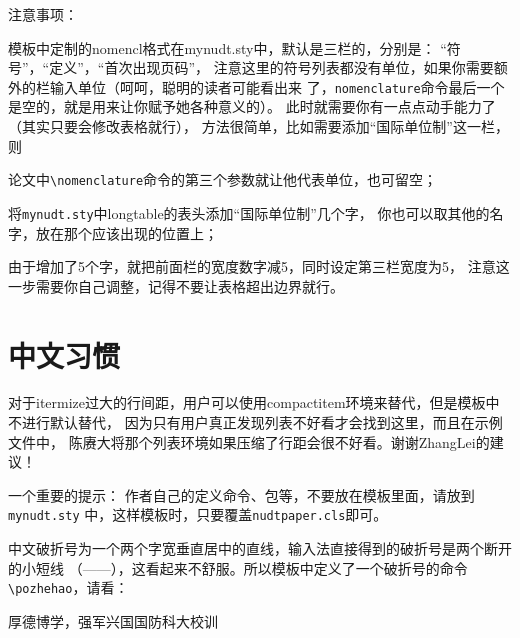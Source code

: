 {\hei 注意事项：}{\kai 模板中定制的nomencl格式在mynudt.sty中，默认是三栏的，分别是：
``符号''，``定义''，``首次出现页码''，
注意这里的符号列表都没有单位，如果你需要额外的栏输入单位（呵呵，聪明的读者可能看出来
了，\verb|nomenclature|命令最后一个是空的，就是用来让你赋予她各种意义的）。
此时就需要你有一点点动手能力了（其实只要会修改表格就行），
方法很简单，比如需要添加``国际单位制''这一栏，则
\begin{compactenum}
\item 论文中\verb|\nomenclature|命令的第三个参数就让他代表单位，也可留空；
\item 将\verb|mynudt.sty|中longtable的表头添加``国际单位制''几个字，
你也可以取其他的名字，放在那个{\kai 应该出现的}位置上；
\item 由于增加了5个字，就把前面栏的宽度数字减5，同时设定第三栏宽度为5，
注意这一步需要你自己调整，记得不要让表格超出边界就行。
\end{compactenum}
}

\section{中文习惯}
\label{sec:chinese}

对于itermize过大的行间距，用户可以使用compactitem环境来替代，但是模板中不进行默认替代，
因为只有用户真正发现列表不好看才会找到这里，而且在示例文件中，
陈赓大将那个列表环境如果压缩了行距会很不好看。谢谢ZhangLei的建议！

{\hei 一个重要的提示：}
作者自己的定义命令、包等，不要放在模板里面，请放到\verb|mynudt.sty|
中，这样模板时，只要覆盖\verb|nudtpaper.cls|即可。

中文破折号为一个两个字宽垂直居中的直线，输入法直接得到的破折号是两个断开的小短线
（——），这看起来不舒服。所以模板中定义了一个破折号的命令 \verb|\pozhehao|，请看：

厚德博学，强军兴国\hfill \pozhehao{}国防科大校训


